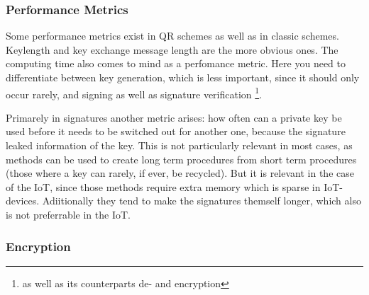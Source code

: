 \documentclass[conference]{IEEEtran}
\newcommand{\comment}[1]{}
\begin{document}
\subsubsection{Performance Metrics}
\comment{ %
- Security Level (1-5, AES-128, SHA256, AES-192, SHA384, AES-256) \cite{QR_Iot_Lattice,Energy_comp}([7]) determined via grovers alg
- no standard benchmark for quantum resistance \cite{QR_comparison} (nist levels 1-5)
} %

Some performance metrics exist in QR schemes as well as in classic schemes.
Keylength and
key exchange message length \cite{QR_algs} are the more obvious ones.
The computing time also comes to mind as a perfomance metric. Here you need to differentiate between key generation, which is less important, since it should only occur rarely, and signing as well as signature verification \footnote{as well as its counterparts de- and encryption}.

Primarely in signatures another metric arises: how often can a private key be used before it needs to be switched out for another one, because the signature leaked information of the key.
This is not particularly relevant in most cases, as methods can be used to create long term procedures from short term procedures (those where a key can rarely, if ever, be recycled).
But it is relevant in the case of the IoT, since those methods require extra memory which is sparse in IoT-devices. Adiitionally they tend to make the signatures themself longer, which also is not preferrable in the IoT. \cite{QR_algs}

\subsubsection{Encryption}
\comment{ %
knapsack problem - broken
''
conjugacy search problem and related problems in braid groups, and the problem of solving
multivariate systems of polynomials in finite fields
'' also mostly broken or badly understood \cite{QR_algs}

lattice based:
- NTRUEncrypt (compare sigs)
code based:
- McEliece Error correction codes transformed - secure and fast (100micros) but keys are k*n matrices : millions of bits \cite{QR_algs} - not feasable 
multivariate-based: decryption inefficent (''guess work'') \cite{QR_comparison}
- Rainbow gigantic 22kbyte pubk
Supersingular EC:
not much in use and not super researched , one impl (SIKE) \cite{QR_comparison}
Mixed schemes for backwards comp: neither fully safe nor efficent since 2 schemes need to be saved on device \cite{QR_comparison}

mostly code/lattice based implementations \cite{QR_comparison}
} %
\end{document}
